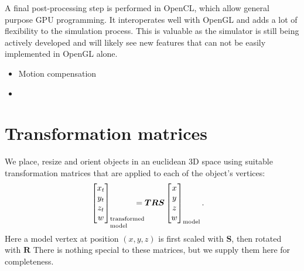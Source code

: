 \documentclass[10pt,journal,draftclsnofoot,onecolumn]{IEEEtran}
\newcommand\bmat[1]{\begin{bmatrix}#1\end{bmatrix}}
\newcommand\mat[1]{\boldsymbol{#1}}
\newcommand\1{\vec 1}
\newcommand*\R{\mat R}
\begin{document}
A final post-processing step is performed in OpenCL, which allow general purpose GPU programming. It interoperates well with OpenGL and adds a lot of flexibility to the simulation process. This is valuable as the simulator is still being actively developed and will likely see new features that can not be easily implemented in OpenGL alone.

\begin{itemize}
\item Motion compensation
\item 
\end{itemize}


\appendix

\section{Transformation matrices}\label{transformation_matrices} 
We place, resize and orient objects in an euclidean 3D space using suitable transformation matrices that are applied to each of the object's vertices:
\begin{align}
\bmat{x_t \\ y_t \\ z_t \\ w}_\text{\parbox{1cm}{\setlength\baselineskip{0.3cm}transformed\\model}} &= \boldsymbol{T}\R\boldsymbol{S} \bmat{x \\ y \\ z \\ w}_\text{model}.
\end{align}
Here a model vertex at position $(x,y,z)$ is first scaled with $\boldsymbol{S}$, then rotated with $\R$
There is nothing special to these matrices, but we supply them here for completeness.
\end{document}
